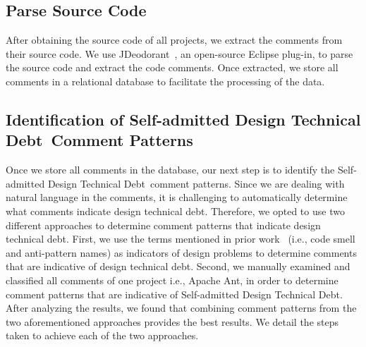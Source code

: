 \documentclass[conference]{IEEEtran}
\newcommand{\SADTD}{Self-admitted Design Technical Debt\xspace}
\begin{document}
 
\subsection{Parse Source Code}

After obtaining the source code of all projects, we extract the comments from their source code. We use JDeodorant~\cite{Tsantalis2008CSMR}, an open-source Eclipse plug-in, to parse the source code and extract the code comments. Once extracted, we store all comments in a relational database to facilitate the processing of the data.


\subsection{Identification of \SADTD~Comment Patterns}
Once we store all comments in the database, our next step is to identify the \SADTD~comment patterns. Since we are dealing with natural language in the comments, it is challenging to automatically determine what comments indicate design technical debt. Therefore, we opted to use two different approaches to determine comment patterns that indicate design technical debt. First, we use the terms mentioned in prior work~\cite{fowler1999refactoring,brown1998antipatterns,martin2009clean} (i.e., code smell and anti-pattern names) as indicators of design problems to determine comments that are indicative of design technical debt. Second, we manually examined and classified all  comments of one project i.e., Apache Ant, in order to determine comment patterns that are indicative of \SADTD. After analyzing the results, we found that combining comment patterns from the two aforementioned approaches provides the best results. We detail the steps taken to achieve each of the two approaches.
\end{document}
